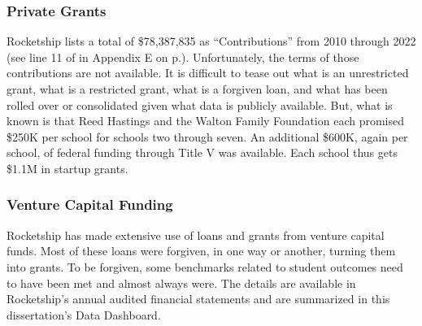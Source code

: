 \subsubsection{Private Grants}%
\label{sec:private-grants}\indent%

Rocketship lists a total of \$78,387,835 as ``Contributions'' from 2010 through 2022 (see line 11 of  in Appendix E on p.\pageref{tab:consolidated_activities}). Unfortunately, the terms of those contributions are not available. It is difficult to tease out what is an unrestricted grant, what is a restricted grant, what is a forgiven loan, and what has been rolled over or consolidated given what data is publicly available. But, what is known is that Reed Hastings and the Walton Family Foundation each promised \$250K per school for schools two through seven. An additional \$600K, again per school, of federal funding through Title V was available. Each school thus gets \$1.1M in startup grants.

\subsubsection{Venture Capital Funding}%
\label{sec:venture-capital_funding}\indent%

Rocketship has made extensive use of loans and grants from venture capital funds. Most of these loans were forgiven, in one way or another, turning them into grants. To be forgiven, some benchmarks related to student outcomes need to have been met and almost always were. The details are available in Rocketship's annual audited financial statements and are summarized in this dissertation's Data Dashboard.

